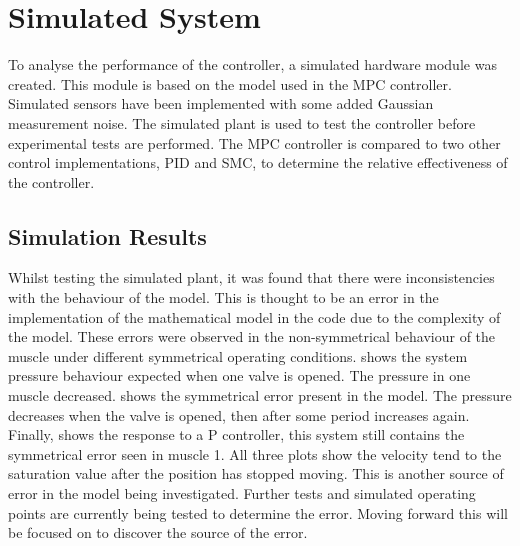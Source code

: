 \documentclass[11pt,a4paper]{article}
\begin{document}
\clearpage
\section{Simulated System}
\label{sub:simulated_system}
To analyse the performance of the controller, a simulated hardware module was created. This module is based on the \cite{hosovsky_2012} model used in the MPC controller. Simulated sensors have been implemented with some added Gaussian measurement noise. The simulated plant is used to test the controller before experimental tests are performed. The MPC controller is compared to two other control implementations, PID and SMC, to determine the relative effectiveness of the controller.

\subsection{Simulation Results}
\label{sub:simulation_results}
Whilst testing the simulated plant, it was found that there were inconsistencies with the behaviour of the model. This is thought to be an error in the implementation of the mathematical model in the code due to the complexity of the model. These errors were observed in the non-symmetrical behaviour of the muscle under different symmetrical operating conditions. \label{fig:simulated_symmectrical_error_2} shows the system pressure behaviour expected when one valve is opened. The pressure in one muscle decreased. \label{fig:simulated_symmectrical_error_2} shows the symmetrical error present in the model. The pressure decreases when the valve is opened, then after some period increases again. Finally, \label{fig:simulated_p_controller} shows the response to a P controller, this system still contains the symmetrical error seen in muscle 1. All three plots show the velocity tend to the saturation value after the position has stopped moving. This is another source of error in the model being investigated. Further tests and simulated operating points are currently being tested to determine the error. Moving forward this will be focused on to discover the source of the error. 
\end{document}

